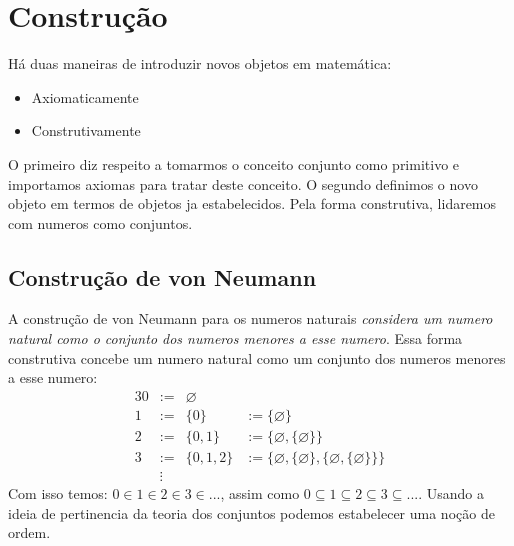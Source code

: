 \section{Construção}
   Há duas maneiras de introduzir novos objetos em matemática:
   \begin{itemize}
      \item Axiomaticamente
      \item Construtivamente
   \end{itemize}
   O primeiro diz respeito a tomarmos o conceito conjunto como 
   primitivo e importamos axiomas para tratar deste conceito. 
   O segundo definimos o novo objeto em termos de objetos ja estabelecidos.
   Pela forma construtiva, lidaremos com numeros como conjuntos.

   \subsection{Construção de von Neumann}
      A construção de von Neumann para os numeros naturais 
      \emph{considera um numero natural como o conjunto dos numeros 
      menores a esse numero}.
      Essa forma construtiva concebe um numero natural como um conjunto dos numeros 
      menores a esse numero:
      \begin{alignat}{3}
         \nonumber 0 &:=& \varnothing\\
         \nonumber 1 &:=& \{0\} &:= \{\varnothing\}\\
         \nonumber 2 &:=& \{0,1\}& := \{\varnothing, \{\varnothing\}\}\\
         \nonumber 3 &:=& \{0,1,2\} &:= 
         \{\varnothing, \{\varnothing\}, \{\varnothing, \{\varnothing\}\}\}\\
         \nonumber &\vdots
      \end{alignat}
      Com isso temos: $0 \in 1 \in 2 \in 3 \in ...$, assim 
      como $ 0 \subseteq 1 \subseteq 2 \subseteq 3 \subseteq ...$. 
      Usando a ideia de pertinencia da teoria dos conjuntos podemos 
      estabelecer uma noção de ordem.

